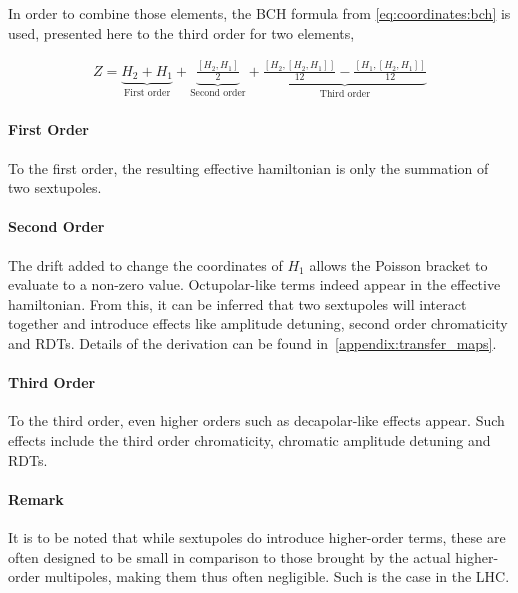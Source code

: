 In order to combine those elements, the BCH formula from \cref{eq:coordinates:bch} is used,
presented here to the third order for two elements,

\small
\begin{equation}
    \begin{aligned}
      Z = \underbrace{H_{2} + H_{1}}_{\text{First order}}
        + \underbrace{\frac{\left[H_{2},H_{1}\right]}{2}}_{\text{Second order}}
        + \underbrace{\frac{\left[H_{2},\left[H_{2},H_{1}\right]\right]}{12} - \frac{\left[H_{1},\left[H_{2},H_{1}\right]\right]}{12}}_{\text{Third order}}
    \end{aligned}
    \label{eq:coordinate_systems:bch_third_order_two_vars}
\end{equation}
\normalsize


\paragraph{First Order}

To the first order, the resulting effective hamiltonian is only the summation of two sextupoles.

\paragraph{Second Order}

The drift added to change the coordinates of $H_1$ allows the Poisson bracket to evaluate to a
non-zero value. Octupolar-like terms indeed appear in the effective hamiltonian. From this, it can
be inferred that two sextupoles will interact together and introduce effects like amplitude
detuning, second order chromaticity and RDTs.
Details of the derivation can be found in~\cref{appendix:transfer_maps}.


\paragraph{Third Order}

To the third order, even higher orders such as decapolar-like effects appear. Such effects
include the third order chromaticity, chromatic amplitude detuning and RDTs.

\paragraph{Remark}

It is to be noted that while sextupoles do introduce higher-order terms, these are often designed to
be small in comparison to those brought by the actual higher-order multipoles, making them thus
often negligible. Such is the case in the LHC.

